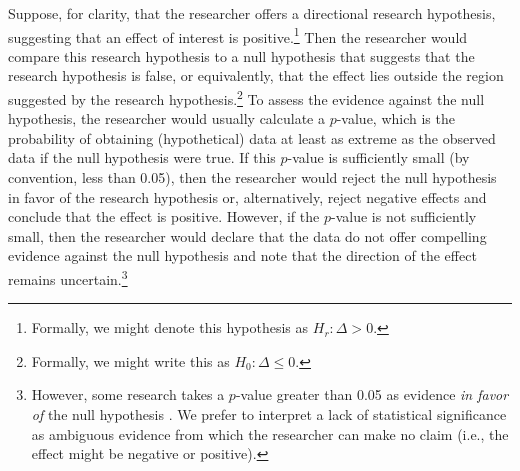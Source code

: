 \documentclass[12pt]{article}
\begin{document}
Suppose, for clarity, that the researcher offers a directional research hypothesis, suggesting that an effect of interest is positive.\footnote{Formally, we might denote this hypothesis as $H_r: \Delta > 0$.} Then the researcher would compare this research hypothesis to a null hypothesis that suggests that the research hypothesis is false, or equivalently, that the effect lies outside the region suggested by the research hypothesis.\footnote{Formally, we might write this as $H_0: \Delta \leq 0$.} To assess the evidence against the null hypothesis, the researcher would usually calculate a $p$-value, which is the probability of obtaining (hypothetical) data at least as extreme as the observed data if the null hypothesis were true. If this $p$-value is sufficiently small (by convention, less than 0.05), then the researcher would reject the null hypothesis in favor of the research hypothesis or, alternatively, reject negative effects and conclude that the effect is positive. However, if the $p$-value is not sufficiently small, then the researcher would declare that the data do not offer compelling evidence against the null hypothesis and note that the direction of the effect remains uncertain.\footnote{However, some research takes a $p$-value greater than 0.05 as evidence \textit{in favor of} the null hypothesis \citep{Rainey2014}. We prefer to interpret a lack of statistical significance as ambiguous evidence from which the researcher can make no claim (i.e., the effect might be negative or positive).}

\end{document}
